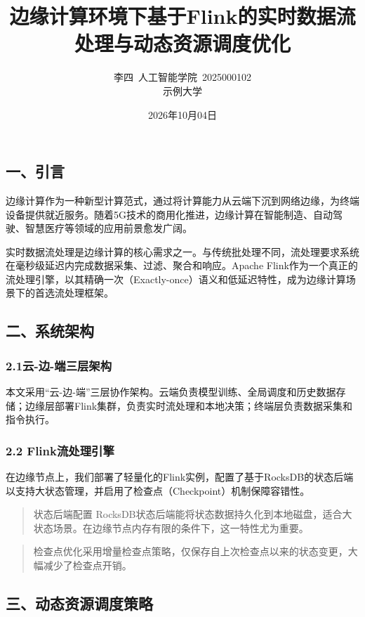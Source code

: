 \documentclass[twocolumn]{harryopo-paper}
\title{边缘计算环境下基于Flink的实时数据流处理与动态资源调度优化}
\author{李四\ 人工智能学院\ 2025000102\\ \fzfs\small 示例大学}
\date{2026年10月04日}
\begin{document}
\maketitlewithabstract
\subsection*{一、引言}

边缘计算作为一种新型计算范式，通过将计算能力从云端下沉到网络边缘，为终端设备提供就近服务。随着5G技术的商用化推进，边缘计算在智能制造、自动驾驶、智慧医疗等领域的应用前景愈发广阔。

实时数据流处理是边缘计算的核心需求之一。与传统批处理不同，流处理要求系统在毫秒级延迟内完成数据采集、过滤、聚合和响应。Apache Flink作为一个真正的流处理引擎，以其精确一次（Exactly-once）语义和低延迟特性，成为边缘计算场景下的首选流处理框架。

\subsection*{二、系统架构}

\subsubsection*{2.1云-边-端三层架构}

本文采用“云-边-端”三层协作架构。云端负责模型训练、全局调度和历史数据存储；边缘层部署Flink集群，负责实时流处理和本地决策；终端层负责数据采集和指令执行。

\subsubsection*{2.2 Flink流处理引擎}

在边缘节点上，我们部署了轻量化的Flink实例，配置了基于RocksDB的状态后端以支持大状态管理，并启用了检查点（Checkpoint）机制保障容错性。

\begin{quote}
{\fzht 状态后端配置} RocksDB状态后端能将状态数据持久化到本地磁盘，适合大状态场景。在边缘节点内存有限的条件下，这一特性尤为重要。
\end{quote}

\begin{quote}
{\fzht 检查点优化}采用增量检查点策略，仅保存自上次检查点以来的状态变更，大幅减少了检查点开销。
\end{quote}

\subsection*{三、动态资源调度策略}
\end{document}
